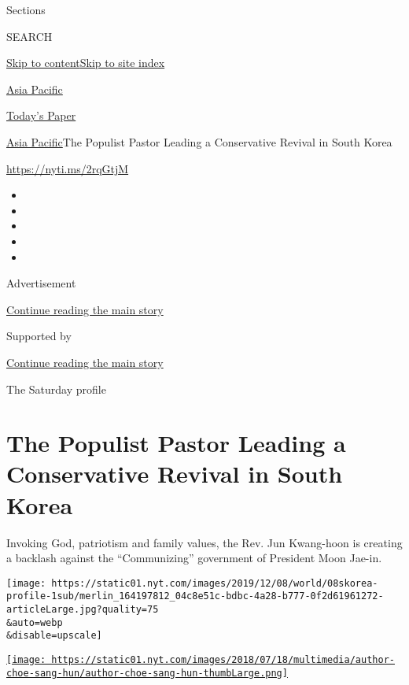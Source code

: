 Sections

SEARCH

\protect\hyperlink{site-content}{Skip to
content}\protect\hyperlink{site-index}{Skip to site index}

\href{https://www.nytimes.com/section/world/asia}{Asia Pacific}

\href{https://myaccount.nytimes.com/auth/login?response_type=cookie\&client_id=vi}{}

\href{https://www.nytimes.com/section/todayspaper}{Today's Paper}

\href{/section/world/asia}{Asia Pacific}\textbar{}The Populist Pastor
Leading a Conservative Revival in South Korea

\url{https://nyti.ms/2rqGtjM}

\begin{itemize}
\item
\item
\item
\item
\item
\end{itemize}

Advertisement

\protect\hyperlink{after-top}{Continue reading the main story}

Supported by

\protect\hyperlink{after-sponsor}{Continue reading the main story}

The Saturday profile

\hypertarget{the-populist-pastor-leading-a-conservative-revival-in-south-korea}{%
\section{The Populist Pastor Leading a Conservative Revival in South
Korea}\label{the-populist-pastor-leading-a-conservative-revival-in-south-korea}}

Invoking God, patriotism and family values, the Rev. Jun Kwang-hoon is
creating a backlash against the ``Communizing'' government of President
Moon Jae-in.

\texttt{[image: https://static01.nyt.com/images/2019/12/08/world/08skorea-profile-1sub/merlin\_164197812\_04c8e51c-bdbc-4a28-b777-0f2d61961272-articleLarge.jpg?quality=75\\\&auto=webp\\\&disable=upscale]}

\href{https://www.nytimes.com/by/choe-sang-hun}{\texttt{[image: https://static01.nyt.com/images/2018/07/18/multimedia/author-choe-sang-hun/author-choe-sang-hun-thumbLarge.png]}}

